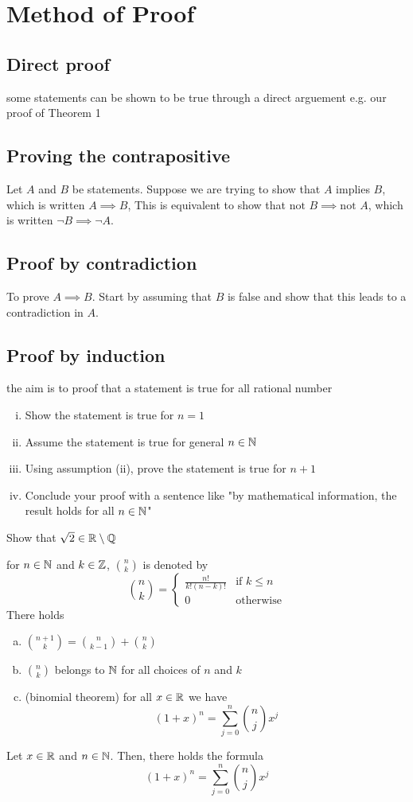 \chapter{Method of Proof}
\section{Direct proof}
some statements can be shown to be true through a direct arguement e.g. our proof of Theorem 1

\section{Proving the contrapositive}
Let $A$ and $B$ be statements. Suppose we are trying to show that $A$ implies $B$, which is written $A \implies B$,
This is equivalent to show that $\text{not }B \implies \text{not }A$, which is written $\lnot B \implies \lnot A$.

\section{Proof by contradiction}
To prove $A \implies B$. Start by assuming that $B$ is false and show that this leads to a contradiction in $A$.

\section{Proof by induction}
the aim is to proof that a statement is true for all rational number
\begin{enumerate}[(i)]
    \item Show the statement is true for $n=1$
    \item Assume the statement is true for general $n\in \mathbb N$
    \item Using assumption (ii), prove the statement is true for $n+1$
    \item Conclude your proof with a sentence like "by mathematical information, the result holds for all $n\in \mathbb N$"
\end{enumerate}
\begin{example}
    Show that $\sqrt{2} \in \mathbb R\setminus\mathbb Q$
\end{example}
\begin{example}
    for $n \in \mathbb N$ and $k \in \mathbb Z$, $\binom{n}{k}$ is denoted by
    \[\binom{n}{k} = \begin{cases}
        \frac{n!}{k!(n-k)!} & \text{if } k \le n \\
        0 & \text{otherwise}
    \end{cases}\]
    There holds
    \begin{enumerate}[(a)]
        \item $\displaystyle\binom{n+1}{k} = \binom{n}{k-1} + \binom{n}{k}$
        \item $\displaystyle\binom{n}{k}$ belongs to $\mathbb N$ for all choices of $n$ and $k$
        \item (binomial theorem) for all $x \in \mathbb R$ we have 
        $$(1+x)^n=\sum_{j=0}^{n} \binom{n}{j}x^j$$
    \end{enumerate}
\end{example}

\begin{theorem}
    Let $x\in \mathbb R$ and $n \in \mathbb N$. Then, there holds the formula
    $$(1+x)^n=\sum_{j=0}^{n} \binom{n}{j}x^j$$
\end{theorem}
